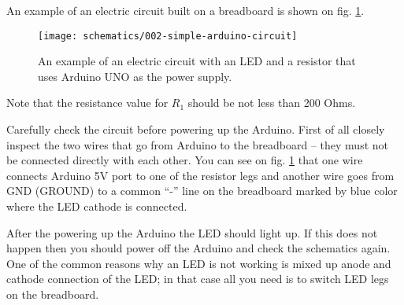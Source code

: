 \documentclass[../sparc.tex]{subfiles}
\begin{document}
An example of an electric circuit built on a breadboard is shown on
fig. \ref{fig:breadboard-simple-arduino-circuit}.

\begin{figure}[ht]
  \centering
  \texttt{[image: schematics/002-simple-arduino-circuit]}
  \caption{An example of an electric circuit with an LED and a resistor that
    uses Arduino UNO as the power supply.}
  \label{fig:breadboard-simple-arduino-circuit}
\end{figure}

Note that the resistance value for $R_1$ should be not less than 200 Ohms.

Carefully check the circuit before powering up the Arduino.  First of all
closely inspect the two wires that go from Arduino to the breadboard -- they must
not be connected directly with each other.  You can see on
fig. \ref{fig:breadboard-simple-arduino-circuit} that one wire connects Arduino
5V port to one of the resistor legs and another wire goes from GND (GROUND) to a
common ``-'' line on the breadboard marked by blue color where the LED cathode
is connected.

After the powering up the Arduino the LED should light up.  If this does not
happen then you should power off the Arduino and check the schematics again.
One of the common reasons why an LED is not working is mixed up anode and
cathode connection of the LED; in that case all you need is to switch LED legs
on the breadboard.

\end{document}
